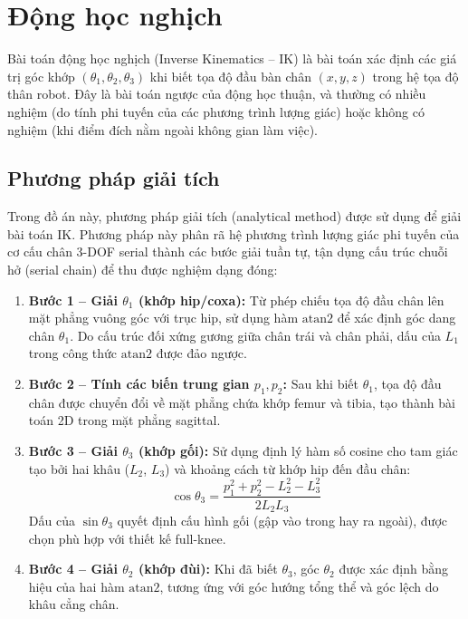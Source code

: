 \section{Động học nghịch }

Bài toán động học nghịch (Inverse Kinematics -- IK) là bài toán xác định các giá trị góc khớp $(\theta_1, \theta_2, \theta_3)$ khi biết tọa độ đầu bàn chân $(x, y, z)$ trong hệ tọa độ thân robot. Đây là bài toán ngược của động học thuận, và thường có nhiều nghiệm (do tính phi tuyến của các phương trình lượng giác) hoặc không có nghiệm (khi điểm đích nằm ngoài không gian làm việc).

\subsection{Phương pháp giải tích}

Trong đồ án này, phương pháp giải tích (analytical method) được sử dụng để giải bài toán IK. Phương pháp này phân rã hệ phương trình lượng giác phi tuyến của cơ cấu chân 3-DOF serial thành các bước giải tuần tự, tận dụng cấu trúc chuỗi hở (serial chain) để thu được nghiệm dạng đóng:

\begin{enumerate}
    \item \textbf{Bước 1 -- Giải $\theta_1$ (khớp hip/coxa):} Từ phép chiếu tọa độ đầu chân lên mặt phẳng vuông góc với trục hip, sử dụng hàm $\text{atan2}$ để xác định góc dang chân $\theta_1$. Do cấu trúc đối xứng gương giữa chân trái và chân phải, dấu của $L_1$ trong công thức $\text{atan2}$ được đảo ngược.

    \item \textbf{Bước 2 -- Tính các biến trung gian $p_1, p_2$:} Sau khi biết $\theta_1$, tọa độ đầu chân được chuyển đổi về mặt phẳng chứa khớp femur và tibia, tạo thành bài toán 2D trong mặt phẳng sagittal.

    \item \textbf{Bước 3 -- Giải $\theta_3$ (khớp gối):} Sử dụng định lý hàm số cosine cho tam giác tạo bởi hai khâu ($L_2$, $L_3$) và khoảng cách từ khớp hip đến đầu chân:
    \begin{equation}
        \cos\theta_3 = \frac{p_1^2 + p_2^2 - L_2^2 - L_3^2}{2 L_2 L_3}
    \end{equation}
    Dấu của $\sin\theta_3$ quyết định cấu hình gối (gập vào trong hay ra ngoài), được chọn phù hợp với thiết kế full-knee.

    \item \textbf{Bước 4 -- Giải $\theta_2$ (khớp đùi):} Khi đã biết $\theta_3$, góc $\theta_2$ được xác định bằng hiệu của hai hàm $\text{atan2}$, tương ứng với góc hướng tổng thể và góc lệch do khâu cẳng chân.
\end{enumerate}

